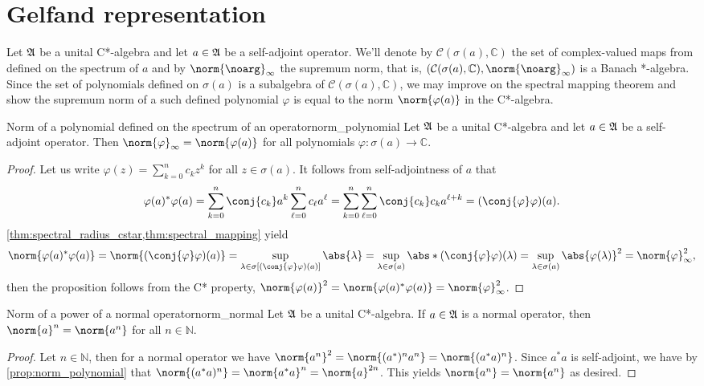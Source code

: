 \section{Gelfand representation}
Let \(\mathfrak{A}\) be a unital C*-algebra and let \(a \in \mathfrak{A}\) be a self-adjoint operator. We'll denote by \(\mathcal{C}(\sigma(a), \mathbb{C})\) the set of \todo[continuous] complex-valued maps from defined on the spectrum of \(a\) and by \(\norm{\noarg}_{\infty}\) the supremum norm, that is, \(\left(\mathcal{C}(\sigma(a), \mathbb{C}), \norm{\noarg}_{\infty}\right)\) is a Banach *-algebra. Since the set of polynomials defined on \(\sigma(a)\) is a subalgebra of \(\mathcal{C}(\sigma(a), \mathbb{C})\), we may improve on the spectral mapping theorem and show the supremum norm of a such defined polynomial \(\varphi\) is equal to the norm \(\norm{\varphi(a)}\) in the C*-algebra.
\begin{proposition}{Norm of a polynomial defined on the spectrum of an operator}{norm_polynomial}
    Let \(\mathfrak{A}\) be a unital C*-algebra and let \(a \in \mathfrak{A}\) be a self-adjoint operator. Then \(\norm{\varphi}_\infty = \norm{\varphi(a)}\) for all polynomials \(\varphi : \sigma(a) \to \mathbb{C}\).
\end{proposition}
\begin{proof}
    Let us write \(\varphi(z) = \sum_{k = 0}^{n} c_k z^k\) for all \(z \in \sigma(a)\). It follows from self-adjointness of \(a\) that
    \begin{equation*}
        \varphi(a)^*\varphi(a) = \sum_{k=0}^n \conj{c_k} a^k \sum_{\ell = 0}^n c_{\ell} a^\ell = \sum_{k = 0}^n \sum_{\ell = 0}^n \conj{c_k} c_k a^{\ell + k} = (\conj{\varphi}\varphi)(a).
    \end{equation*}
    \cref{thm:spectral_radius_cstar,thm:spectral_mapping} yield
    \begin{equation*}
        \norm{\varphi(a)^*\varphi(a)} = \norm{(\conj{\varphi}\varphi)(a)} = \sup_{\lambda \in \sigma\left[(\conj{\varphi}\varphi)(a)\right]}{\abs{\lambda}} = \sup_{\lambda \in \sigma(a)}{\abs*{(\conj{\varphi}\varphi)(\lambda)}} = \sup_{\lambda\in \sigma(a)}{\abs{\varphi(\lambda)}^2} = \norm{\varphi}_{\infty}^2,
    \end{equation*}
    then the proposition follows from the C* property, \(\norm{\varphi(a)}^2 = \norm{\varphi(a)^*\varphi(a)} = \norm{\varphi}_{\infty}^2\).
\end{proof}

\begin{proposition}{Norm of a power of a normal operator}{norm_normal}
    Let \(\mathfrak{A}\) be a unital C*-algebra. If \(a \in \mathfrak{A}\) is a normal operator, then \(\norm{a}^n = \norm{a^n}\) for all \(n \in \mathbb{N}\).
\end{proposition}
\begin{proof}
    Let \(n \in \mathbb{N}\), then for a normal operator we have \(\norm{a^n}^2 = \norm{(a^*)^n a^n} = \norm{(a^*a)^n}\). Since \(a^*a\) is self-adjoint, we have by \cref{prop:norm_polynomial} that \(\norm{(a^*a)^n} = \norm{a^*a}^n = \norm{a}^{2n}\). This yields \(\norm{a^n} = \norm{a^n}\) as desired.
\end{proof}

